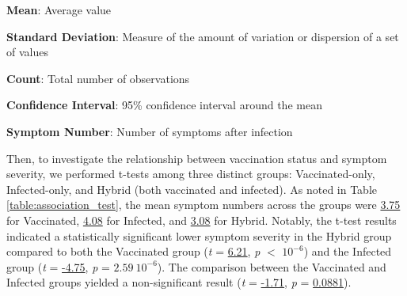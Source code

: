\documentclass[11pt]{article}
\begin{document}
\begin{table}[h]
\caption{\protect\hyperlink{file-table-0-pkl}{Descriptive Statistics of the dataset}}
\label{table:descriptive_statistics}
\begin{threeparttable}
\renewcommand{\TPTminimum}{\linewidth}
\begin{tablenotes}
\footnotesize
\item \textbf{Mean}: Average value
\item \textbf{Standard Deviation}: Measure of the amount of variation or dispersion of a set of values
\item \textbf{Count}: Total number of observations
\item \textbf{Confidence Interval}: 95\% confidence interval around the mean
\item \textbf{Symptom Number}: Number of symptoms after infection
\end{tablenotes}
\end{threeparttable}
\end{table}

Then, to investigate the relationship between vaccination status and symptom severity, we performed t-tests among three distinct groups: Vaccinated-only, Infected-only, and Hybrid (both vaccinated and infected). As noted in Table \ref{table:association_test}, the mean symptom numbers across the groups were \hyperlink{B0a}{3.75} for Vaccinated, \hyperlink{B0b}{4.08} for Infected, and \hyperlink{B0c}{3.08} for Hybrid. Notably, the t-test results indicated a statistically significant lower symptom severity in the Hybrid group compared to both the Vaccinated group (\textit{t} = \hyperlink{B4b}{6.21}, \textit{p} $<$ \hyperlink{B5b}{$10^{-6}$}) and the Infected group (\textit{t} = \hyperlink{B4c}{-4.75}, \textit{p} = \hyperlink{B5c}{$2.59\ 10^{-6}$}). The comparison between the Vaccinated and Infected groups yielded a non-significant result (\textit{t} = \hyperlink{B4a}{-1.71}, \textit{p} = \hyperlink{B5a}{0.0881}).
\end{document}
